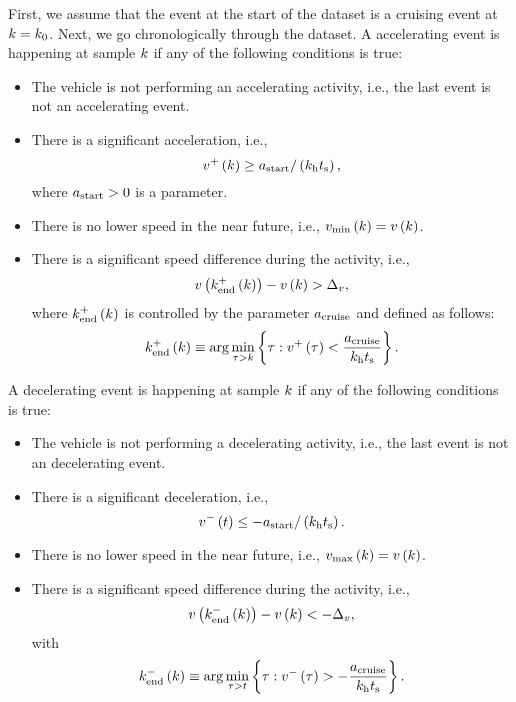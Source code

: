 First, we assume that the event at the start of the dataset is a cruising event at $k=k_{0}$. Next, we go chronologically through the dataset. A accelerating event is happening at sample $k$ if any of the following conditions is true:
\begin{itemize}
	\item The vehicle is not performing an accelerating activity, i.e., the last event is not an accelerating event.
	\item There is a significant acceleration, i.e., 
	\begin{equation}
		v^{+}\left(k\right) \geq a_\mathrm{start} / \left( k_{\mathrm{h}}t_\mathrm{s} \right),
	\end{equation}
	where $a_\mathrm{start}>0$ is a parameter.
	\item There is no lower speed in the near future, i.e., $v_{\mathrm{min}}\left(k\right)=v\left(k\right)$.
	\item There is a significant speed difference during the activity, i.e., 
	\begin{equation}
		v\left(k_{\mathrm{end}}^{+}\left(k\right)\right) - v\left(k\right) > \Delta_{v},
	\end{equation}
	where $k_{\mathrm{end}}^{+}\left(k\right)$ is controlled by the parameter $a_\mathrm{cruise}$ and defined as follows:
	\begin{equation}
		k_{\mathrm{end}}^{+}\left(k\right) \equiv \arg \min_{\tau > k} \left\{ \tau: v^{+}\left(\tau\right) < \frac{a_\mathrm{cruise}}{k_{\mathrm{h}}t_\mathrm{s}} \right\}.
	\end{equation}
\end{itemize}

A decelerating event is happening at sample $k$ if any of the following conditions is true:
\begin{itemize}
	\item The vehicle is not performing a decelerating activity, i.e., the last event is not an decelerating event.
	\item There is a significant deceleration, i.e., 
	\begin{equation}
		v^{-}\left(t\right) \leq -a_\mathrm{start} / \left( k_{\mathrm{h}}t_\mathrm{s} \right).
	\end{equation}
	\item There is no lower speed in the near future, i.e., $v_{\mathrm{max}}\left(k\right)=v\left(k\right)$.
	\item There is a significant speed difference during the activity, i.e., 
	\begin{equation}
		v\left(k_{\mathrm{end}}^{-}\left(k\right)\right) - v\left(k\right) < -\Delta_{v},
	\end{equation}
	with
	\begin{equation}
		k_{\mathrm{end}}^{-}\left(k\right) \equiv \arg \min_{\tau > t} \left\{ \tau: v^{-}\left(\tau\right) > -\frac{a_\mathrm{cruise}}{k_{\mathrm{h}}t_\mathrm{s}} \right\}.
	\end{equation}
\end{itemize}

